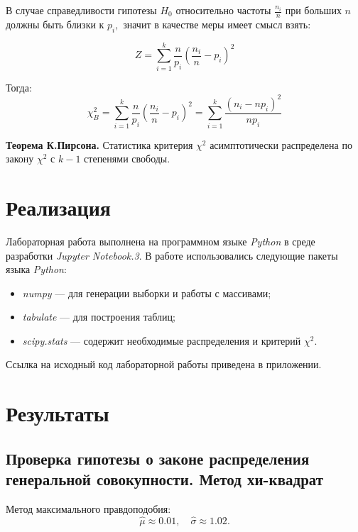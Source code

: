 \documentclass[12pt,a4paper]{article}
\begin{document}
	В случае справедливости гипотезы $H_0$ относительно частоты $\frac{n_i}{n}$ при больших $n$ должны быть близки к $p_i,$ значит в качестве меры имеет смысл взять: 
	
	\begin{equation}
	Z = \sum\limits_{i=1}^k\frac{n}{p_i}\left(\frac{n_i}{n}-p_i\right)^2
	\end{equation}
	
	Тогда:
	\begin{equation}
	\chi^2_B=\sum\limits_{i=1}^k\frac{n}{p_i}\left(\frac{n_i}{n}-p_i\right)^2=\sum\limits_{i=1}^k\frac{(n_i-np_i)^2}{np_i}
	\end{equation}
	
	\textbf{Теорема К.Пирсона.} Статистика критерия $\chi^2$ асимптотически распределена по закону $\chi^2$ с $k - 1$ степенями свободы.
	
	\section{Реализация}
		Лабораторная работа выполнена на программном языке \emph{Python} в среде разработки \emph{Jupyter Notebook.3}. В работе использовались следующие пакеты языка \emph{Python}:
		\begin{itemize}
			\item \emph{numpy} --- для генерации выборки и работы с массивами;
			
			\item \emph{tabulate} --- для построения таблиц;
			
			\item \emph{scipy.stats} --- содержит необходимые распределения и критерий $\chi^2$.
		\end{itemize}
		Ссылка на исходный код лабораторной работы приведена в приложении.

	\section{Результаты}
		\subsection{Проверка гипотезы о законе распределения генеральной совокупности. Метод хи-квадрат}
		Метод максимального правдоподобия:
		$$\hat{\mu} \approx 0.01, \quad \hat{\sigma} \approx 1.02.$$
		
\end{document}
